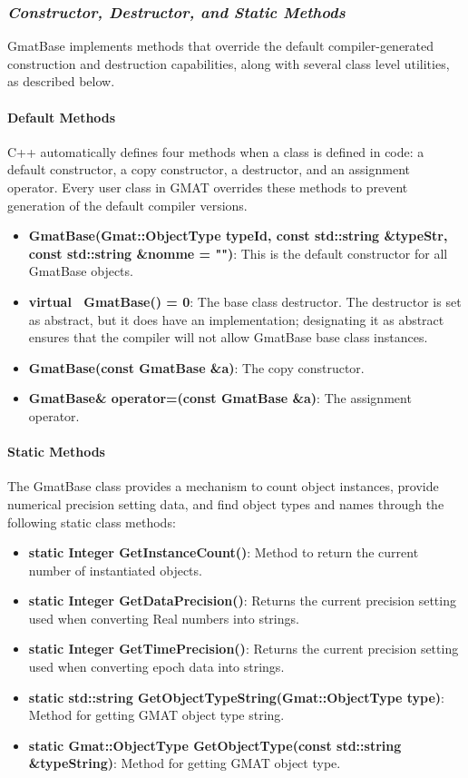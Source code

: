 \subsubsection{\textit{Constructor, Destructor, and Static Methods}}

GmatBase implements methods that override the default compiler-generated construction and
destruction capabilities, along with several class level utilities, as described below.

\paragraph{Default Methods}

C++ automatically defines four methods when a class is defined in code: a default constructor, a
copy constructor, a destructor, and an assignment operator.  Every user class in GMAT overrides
these methods to prevent generation of the default compiler versions.

\begin{itemize}
\item \textbf{GmatBase(Gmat::ObjectType typeId, const std::string \&typeStr, const std::string
\&nomme = "")}:  This is the default constructor for all GmatBase objects.
\item \textbf{virtual ~GmatBase() = 0}:  The base class destructor.  The destructor is set as
abstract, but it does have an implementation; designating it as abstract ensures that the compiler
will not allow GmatBase base class instances.
\item \textbf{GmatBase(const GmatBase \&a)}: The copy constructor.
\item \textbf{GmatBase\& operator=(const GmatBase \&a)}:  The assignment operator.
\end{itemize}

\paragraph{Static Methods}

The GmatBase class provides a mechanism to count object instances, provide numerical precision
setting data, and find object types and names through the following static class methods:

\begin{itemize}
\item \textbf{static Integer GetInstanceCount()}: Method to return the current number of
instantiated objects.
\item \textbf{static Integer GetDataPrecision()}: Returns the current precision setting used when
converting Real numbers into strings.
\item \textbf{static Integer GetTimePrecision()}: Returns the current precision setting used when
converting epoch data into strings.
\item \textbf{static std::string GetObjectTypeString(Gmat::ObjectType type)}: Method for getting
GMAT object type string.
\item \textbf{static Gmat::ObjectType GetObjectType(const std::string \&typeString)}: Method for
getting GMAT object type.
\end{itemize}

